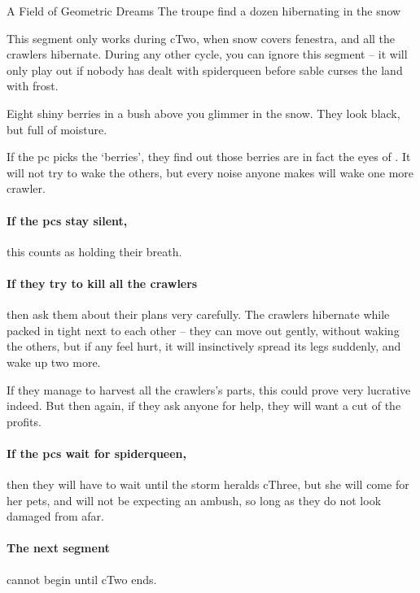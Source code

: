 {A Field of Geometric Dreams}%
{The troupe find a dozen hibernating  in the snow}%
\label{spiderDreams}

This \gls{segment} only works during \gls{cTwo}, when \gls{snow} covers \gls{fenestra}, and all the \glspl{crawler} hibernate.
During any other \gls{cycle}, you can ignore this \gls{segment} -- it will only play out if nobody has dealt with \gls{spiderqueen} before \gls{sable} curses the land with frost.

\begin{boxtext}
	Eight shiny berries in a bush above you glimmer in the snow.
	They look black, but full of moisture.
\end{boxtext}

If the \gls{pc} picks the `berries', they find out those berries are in fact the eyes of .
It will not try to wake the others, but every noise anyone makes will wake one more \gls{crawler}.

\paragraph{If the \glspl{pc} stay silent,}
this counts as holding their breath.%

\paragraph{If they try to kill all the \glspl{crawler}}
then ask them about their plans very carefully.
The \glspl{crawler} hibernate while packed in tight next to each other -- they can move out gently, without waking the others, but if any feel hurt, it will insinctively spread its legs suddenly, and wake up two more.



If they manage to harvest all the \glspl{crawler}'s parts, this could prove very lucrative indeed.
But then again, if they ask anyone for help, they will want a cut of the profits.

\paragraph{If the \glspl{pc} wait for \gls{spiderqueen},}
then they will have to wait until the \gls{storm} heralds \gls{cThree}, but she will come for her pets, and will not be expecting an ambush, so long as they do not look damaged from afar.

\paragraph{The next \gls{segment}}
cannot begin until \gls{cTwo} ends.
